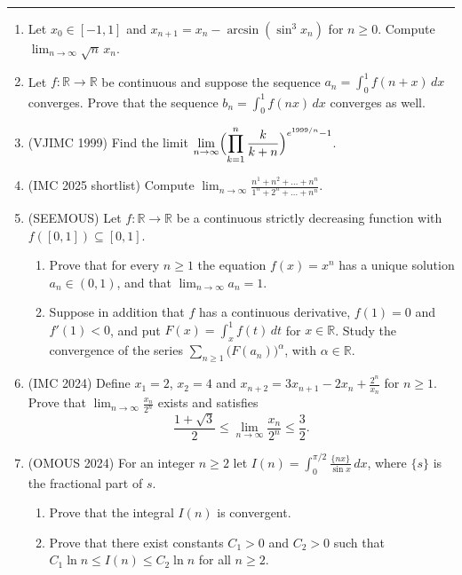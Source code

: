 \documentclass[11pt,a4paper]{article}
\renewcommand{\le}{\leqslant}
\renewcommand{\ge}{\geqslant}
\begin{document}
\noindent\rule{\textwidth}{0.4pt}\par\vspace{4pt}
\begin{enumerate}
\item Let $x_0\in[-1,1]$ and $x_{n+1}=x_n-\arcsin(\sin^3x_n)$ for $n\ge0$. Compute
$\lim_{n\to\infty}\sqrt n\,x_n$.

\item Let $f\colon\mathbb R\to\mathbb R$ be continuous and suppose the sequence
$a_n=\int_0^1f(n+x)\,dx$ converges. Prove that the sequence $b_n=\int_0^1f(nx)\,dx$ converges as
well.

\item (VJIMC 1999) Find the limit
$\displaystyle\lim_{n\to\infty}\Bigl(\prod_{k=1}^n\frac k{k+n}\Bigr)^{e^{1999/n}-1}$.

\item (IMC 2025 shortlist) Compute
$\displaystyle\lim_{n\to\infty}\frac{n^1+n^2+\dots+n^n}{1^n+2^n+\dots+n^n}$.

\item (SEEMOUS) Let $f\colon\mathbb R\to\mathbb R$ be a continuous strictly decreasing function
with $f([0,1])\subseteq[0,1]$.
\begin{enumerate}[label=\alph*)]
\item Prove that for every $n\ge1$ the equation $f(x)=x^n$ has a unique solution $a_n\in(0,1)$,
and that $\lim_{n\to\infty}a_n=1$.
\item Suppose in addition that $f$ has a continuous derivative, $f(1)=0$ and $f'(1)<0$, and put
$F(x)=\int_x^1f(t)\,dt$ for $x\in\mathbb R$. Study the convergence of the series
$\sum_{n\ge1}\bigl(F(a_n)\bigr)^\alpha$, with $\alpha\in\mathbb R$.
\end{enumerate}

\item (IMC 2024) Define $x_1=2$, $x_2=4$ and $x_{n+2}=3x_{n+1}-2x_n+\frac{2^n}{x_n}$ for $n\ge1$.
Prove that $\lim_{n\to\infty}\frac{x_n}{2^n}$ exists and satisfies
\[\frac{1+\sqrt3}2\le\lim_{n\to\infty}\frac{x_n}{2^n}\le\frac32.\]

\item (OMOUS 2024) For an integer $n\ge2$ let
$\displaystyle I(n)=\int_0^{\pi/2}\frac{\{nx\}}{\sin x}\,dx$, where $\{s\}$ is the fractional part
of $s$.
\begin{enumerate}[label=\alph*)]
\item Prove that the integral $I(n)$ is convergent.
\item Prove that there exist constants $C_1>0$ and $C_2>0$ such that $C_1\ln n\le I(n)\le C_2\ln n$
for all $n\ge2$.
\end{enumerate}


\end{enumerate}
\end{document}
